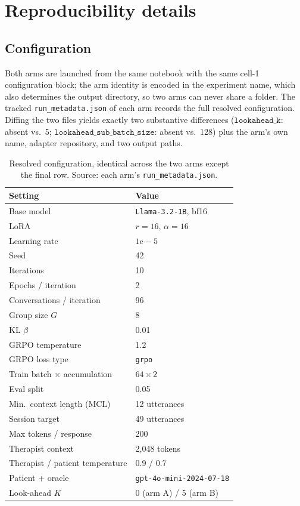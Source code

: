 \section{Reproducibility details}
\label{app:repro}

\subsection{Configuration}

Both arms are launched from the same notebook with the same cell-1 configuration block; the arm
identity is encoded in the experiment name, which also determines the output directory, so two
arms can never share a folder. The tracked \texttt{run\_metadata.json} of each arm records the full
resolved configuration. Diffing the two files yields exactly two substantive differences
($\texttt{lookahead\_k}$: absent vs.\ 5; $\texttt{lookahead\_sub\_batch\_size}$: absent vs.\ 128)
plus the arm's own name, adapter repository, and two output paths.

\begin{table}[h]
\centering
\small
\setlength{\tabcolsep}{3pt}
\begin{tabular}{@{}ll@{}}
\toprule
Setting & Value \\
\midrule
Base model & \texttt{Llama-3.2-1B}, bf16 \\
LoRA & $r{=}16$, $\alpha{=}16$ \\
Learning rate & $1\mathrm{e}{-}5$ \\
Seed & 42 \\
Iterations & 10 \\
Epochs / iteration & 2 \\
Conversations / iteration & 96 \\
Group size $G$ & 8 \\
KL $\beta$ & 0.01 \\
GRPO temperature & 1.2 \\
GRPO loss type & \texttt{grpo} \\
Train batch $\times$ accumulation & $64 \times 2$ \\
Eval split & 0.05 \\
Min.\ context length (MCL) & 12 utterances \\
Session target & 49 utterances \\
Max tokens / response & 200 \\
Therapist context & 2{,}048 tokens \\
Therapist / patient temperature & 0.9 / 0.7 \\
Patient + oracle & \texttt{gpt-4o-mini-2024-07-18} \\
Look-ahead $K$ & 0 (arm A) / 5 (arm B) \\
\bottomrule
\end{tabular}
\caption{Resolved configuration, identical across the two arms except the final row.
Source: each arm's \texttt{run\_metadata.json}.}
\label{tab:config}
\end{table}

